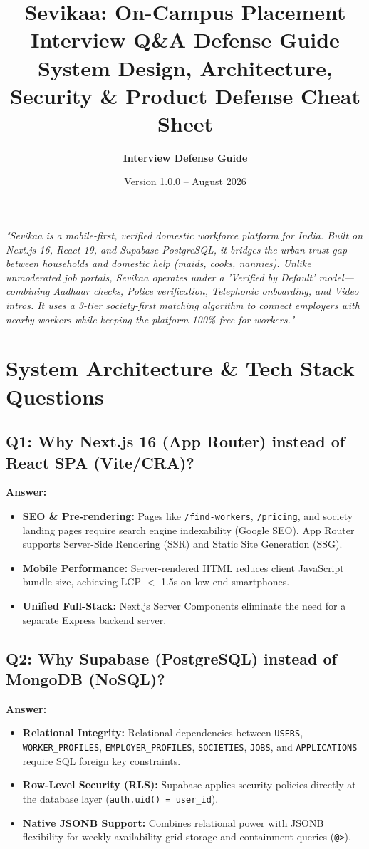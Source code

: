 \documentclass[11pt,a4paper]{article}
\title{\textbf{\huge Sevikaa: On-Campus Placement Interview Q\&A Defense Guide}\\[0.5em]
\large System Design, Architecture, Security \& Product Defense Cheat Sheet}
\author{\textbf{Interview Defense Guide}}
\date{Version 1.0.0 -- August 2026}
\begin{document}
\maketitle

\begin{tcolorbox}[colback=blue!5white,colframe=primaryblue,title=\textbf{30-Second Elevator Pitch}]
\textit{"Sevikaa is a mobile-first, verified domestic workforce platform for India. Built on Next.js 16, React 19, and Supabase PostgreSQL, it bridges the urban trust gap between households and domestic help (maids, cooks, nannies). Unlike unmoderated job portals, Sevikaa operates under a 'Verified by Default' model—combining Aadhaar checks, Police verification, Telephonic onboarding, and Video intros. It uses a 3-tier society-first matching algorithm to connect employers with nearby workers while keeping the platform 100\% free for workers."}
\end{tcolorbox}

\section{System Architecture \& Tech Stack Questions}

\subsection{Q1: Why Next.js 16 (App Router) instead of React SPA (Vite/CRA)?}
\textbf{Answer:}
\begin{itemize}[noitemsep]
    \item \textbf{SEO \& Pre-rendering:} Pages like \texttt{/find-workers}, \texttt{/pricing}, and society landing pages require search engine indexability (Google SEO). App Router supports Server-Side Rendering (SSR) and Static Site Generation (SSG).
    \item \textbf{Mobile Performance:} Server-rendered HTML reduces client JavaScript bundle size, achieving LCP $<$ 1.5s on low-end smartphones.
    \item \textbf{Unified Full-Stack:} Next.js Server Components eliminate the need for a separate Express backend server.
\end{itemize}

\subsection{Q2: Why Supabase (PostgreSQL) instead of MongoDB (NoSQL)?}
\textbf{Answer:}
\begin{itemize}[noitemsep]
    \item \textbf{Relational Integrity:} Relational dependencies between \texttt{USERS}, \texttt{WORKER\_PROFILES}, \texttt{EMPLOYER\_PROFILES}, \texttt{SOCIETIES}, \texttt{JOBS}, and \texttt{APPLICATIONS} require SQL foreign key constraints.
    \item \textbf{Row-Level Security (RLS):} Supabase applies security policies directly at the database layer (\texttt{auth.uid() = user\_id}).
    \item \textbf{Native JSONB Support:} Combines relational power with JSONB flexibility for weekly availability grid storage and containment queries (\texttt{@>}).
\end{itemize}
\end{document}
